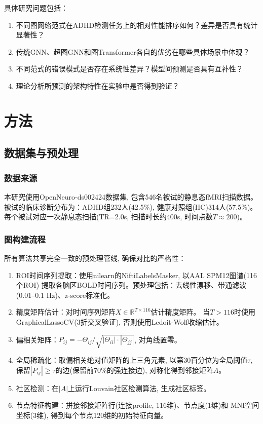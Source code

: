 \documentclass[12pt,a4paper,heading=true,fontset=windows]{ctexart}
\newcommand{\kw}[1]{{\heiti #1}}
\begin{document}
具体研究问题包括：
\begin{enumerate}
    \item 不同图网络范式在ADHD检测任务上的相对性能排序如何？差异是否具有统计显著性？
    \item 传统GNN、超图GNN和图Transformer各自的优劣在哪些具体场景中体现？
    \item 不同范式的错误模式是否存在系统性差异？模型间预测是否具有互补性？
    \item 理论分析所预测的架构特性在实验中是否得到验证？
\end{enumerate}

\section{方法}

\subsection{数据集与预处理}

\subsubsection{数据来源}

本研究使用OpenNeuro-ds002424数据集\cite{booth2021}, 包含546名被试的静息态fMRI扫描数据。
被试的临床诊断分布为：ADHD组232人(42.5\%), 健康对照组(HC)314人(57.5\%)。
每个被试对应一次静息态扫描(TR=2.0s, 扫描时长约400s, 时间点数$T \approx 200$)。

\subsubsection{图构建流程}

所有算法共享完全一致的预处理管线, 确保对比的严格性：

\begin{enumerate}[leftmargin=3em]
    \item \kw{ROI时间序列提取}：使用nilearn的NiftiLabelsMasker, 以AAL SPM12图谱(116个ROI)
          提取各脑区BOLD时间序列。预处理包括：去线性漂移、带通滤波(0.01--0.1 Hz)、z-score标准化。
    \item \kw{精度矩阵估计}：对时间序列矩阵$X \in \mathbb{R}^{T \times 116}$估计精度矩阵。
          当$T > 116$时使用GraphicalLassoCV(3折交叉验证), 否则使用Ledoit-Wolf收缩估计。
    \item \kw{偏相关矩阵}：$P_{ij} = -\Theta_{ij} / \sqrt{|\Theta_{ii}| \cdot |\Theta_{jj}|}$, 对角线置零。
    \item \kw{全局稀疏化}：取偏相关绝对值矩阵的上三角元素, 以第30百分位为全局阈值$\tau$,
          保留$|P_{ij}| \geq \tau$的边(保留前70\%的强连接边), 对称化得到邻接矩阵$A$。
    \item \kw{社区检测}：在$|A|$上运行Louvain社区检测算法, 生成社区标签。
    \item \kw{节点特征构建}：拼接邻接矩阵行(连接profile, 116维)、节点度(1维)和
          MNI空间坐标(3维), 得到每个节点120维的初始特征向量。
\end{enumerate}
\end{document}
